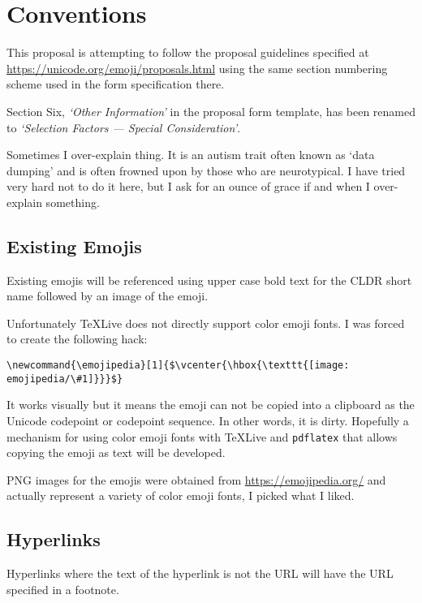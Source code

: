 \section*{Conventions}

This proposal is attempting to follow the proposal guidelines specified at
\url{https://unicode.org/emoji/proposals.html} using the same section numbering
scheme used in the form specification there.

Section Six, \textit{`Other Information'} in the proposal form template, has been renamed to
\textit{`Selection Factors --- Special Consideration'}.

Sometimes I over-explain thing. It is an autism trait often known as `data dumping' and
is often frowned upon by those who are neurotypical. I have tried very hard not to do
it here, but I ask for an ounce of grace if and when I over-explain something.

\subsection*{Existing Emojis}

Existing emojis will be referenced using upper case bold text for the CLDR short name
followed by an image of the emoji.

Unfortunately \TeX{}Live does not directly support color emoji fonts. I was forced to
create the following hack:

\begin{verbatim}
\newcommand{\emojipedia}[1]{$\vcenter{\hbox{\texttt{[image: emojipedia/\#1]}}}$}
\end{verbatim}

It works visually but it means the emoji can not be copied into a clipboard as the
Unicode codepoint or codepoint sequence. In other words, it is dirty. Hopefully a
mechanism for using color emoji fonts with \TeX{}Live and \texttt{pdflatex} that
allows copying the emoji as text will be developed.

PNG images for the emojis were obtained from \url{https://emojipedia.org/} and actually
represent a variety of color emoji fonts, I picked what I liked.

\subsection*{Hyperlinks}

Hyperlinks where the text of the hyperlink is not the URL will have the URL specified
in a footnote.

